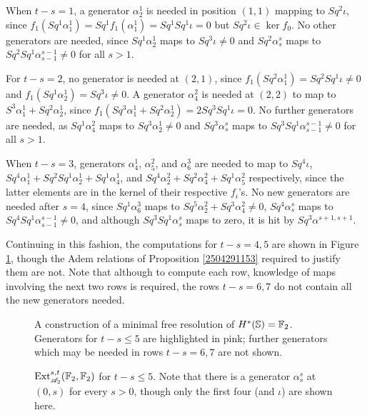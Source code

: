 \documentclass[11pt, titlepage]{article} %
\def\bb{\ensuremath\mathbb}
\def\A{\ensuremath{\mathscr{A}_2}}
\DeclareMathOperator{\Ext}{Ext}
\numberwithin{equation}{subsection}
\theoremstyle{plain}
\theoremstyle{definition}
\begin{document}
When \(t-s=1\), a generator \(\alpha^1_2\) is needed in position \((1,1)\) mapping to \(Sq^2\iota\), since \(f_1(Sq^1\alpha^1_1)=Sq^1f_1(\alpha^1_1)=Sq^1
Sq^1\iota=0\) but \(Sq^2\iota\in \ker f_0\). No other generators are needed, since \(Sq^1\alpha^1_2\) maps to \(Sq^3\iota\neq 0\) and \(Sq^2\alpha^s_s\) maps to \(Sq^2Sq^1\alpha^{s-1}_{s-1}\neq 0\) for all \(s>1\).

For \(t-s=2\), no generator is needed at \((2,1)\), since \(f_1(Sq^2\alpha^1_1)=Sq^2Sq^1\iota\neq 0\) and \(f_1(Sq^1\alpha^1_2)=Sq^3\iota\neq 0\). A generator \(\alpha^2_4\) is needed at \((2, 2)\) to map to \(S^3\alpha^1_1+Sq^2\alpha^1_2\), since \(f_1(Sq^3\alpha^1_1+Sq^2\alpha^1_2)=2Sq^3 Sq^1\iota=0\). No further generators are needed, as \(Sq^1\alpha^2_4\) maps to \(Sq^3\alpha^1_2\neq 0\) and \(Sq^3\alpha^s_s\) maps to \(Sq^3Sq^1\alpha^{s-1}_{s-1}\neq 0\) for all \(s>1\).

When \(t-s=3\), generators \(\alpha^1_4\), \(\alpha^2_5\), and \(\alpha^3_6\) are needed to map to \(Sq^4\iota\), \(Sq^4\alpha^1_1+Sq^2Sq^1\alpha^1_2+Sq^1 \alpha^1_4\), and \(Sq^4\alpha^2_2+Sq^2\alpha^2_4+Sq^1\alpha^2_5\) respectively, since the latter elements are in the kernel of their respective \(f_i\)'s. No new generators are needed after \(s=4\), since \(Sq^1\alpha^3_6\) maps to \(Sq^5\alpha^2_2+Sq^3\alpha^2_4\neq 0\), \(Sq^4\alpha^s_s\) maps to \(Sq^4Sq^1\alpha^{s-1}_{s-1}\neq 0\), and although \(Sq^3Sq^1\alpha^s_s\) maps to zero, it is hit by \(Sq^3\alpha^{s+1,s+1}\). 

Continuing in this fashion, the computations for \(t-s=4,5\) are shown in Figure \ref{2504201106}, though the Adem relations of Proposition \ref{2504291153} required to justify them are not. Note that although to compute each row, knowledge of maps involving the next two rows is required, the rows \(t-s=6,7\) do not contain all the new generators needed. 

\begin{figure}
\centering

\caption{A construction of a minimal free resolution of \(H^*(\bb{S})=\bb{F}_2\). Generators for \(t-s\leq5\) are highlighted in pink; further generators which may be needed in rows \(t-s=6, 7\) are not shown.}\label{2504201106}
\end{figure}

\begin{figure}
\centering

\caption{\(\Ext^{s,t}_{\A}(\bb{F}_2, \bb{F}_2)\) for \(t-s\leq 5\). Note that there is a generator \(\alpha^s_s\) at \((0,s)\) for every \(s> 0\), though only the first four (and \(\iota\)) are shown here.}
\label{2504241018}
\end{figure}
\end{document}
